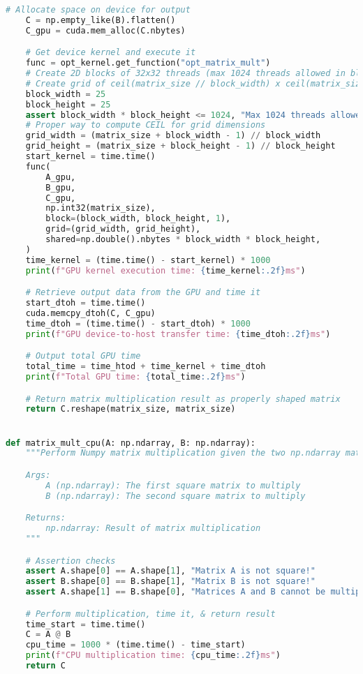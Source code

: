\documentclass[11pt,twoside]{article}
\begin{document}
\begin{enumerate}
\begin{lstlisting}[language=Python]
    # Allocate space on device for output
    C = np.empty_like(B).flatten()
    C_gpu = cuda.mem_alloc(C.nbytes)

    # Get device kernel and execute it
    func = opt_kernel.get_function("opt_matrix_mult")
    # Create 2D blocks of 32x32 threads (max 1024 threads allowed in block)
    # Create grid of ceil(matrix_size // block_width) x ceil(matrix_size // block_height) blocks
    block_width = 25
    block_height = 25
    assert block_width * block_height <= 1024, "Max 1024 threads allowed in block!"
    # Proper way to compute CEIL for grid dimensions
    grid_width = (matrix_size + block_width - 1) // block_width
    grid_height = (matrix_size + block_height - 1) // block_height
    start_kernel = time.time()
    func(
        A_gpu,
        B_gpu,
        C_gpu,
        np.int32(matrix_size),
        block=(block_width, block_height, 1),
        grid=(grid_width, grid_height),
        shared=np.double().nbytes * block_width * block_height,
    )
    time_kernel = (time.time() - start_kernel) * 1000
    print(f"GPU kernel execution time: {time_kernel:.2f}ms")

    # Retrieve output data from the GPU and time it
    start_dtoh = time.time()
    cuda.memcpy_dtoh(C, C_gpu)
    time_dtoh = (time.time() - start_dtoh) * 1000
    print(f"GPU device-to-host transfer time: {time_dtoh:.2f}ms")

    # Output total GPU time
    total_time = time_htod + time_kernel + time_dtoh
    print(f"Total GPU time: {total_time:.2f}ms")

    # Return matrix multiplication result as properly shaped matrix
    return C.reshape(matrix_size, matrix_size)


def matrix_mult_cpu(A: np.ndarray, B: np.ndarray):
    """Perform Numpy matrix multiplication given the two np.ndarray matrices

    Args:
        A (np.ndarray): The first square matrix to multiply
        B (np.ndarray): The second square matrix to multiply

    Returns:
        np.ndarray: Result of matrix multiplication
    """

    # Assertion checks
    assert A.shape[0] == A.shape[1], "Matrix A is not square!"
    assert B.shape[0] == B.shape[1], "Matrix B is not square!"
    assert A.shape[1] == B.shape[0], "Matrices A and B cannot be multiplied!"

    # Perform multiplication, time it, & return result
    time_start = time.time()
    C = A @ B
    cpu_time = 1000 * (time.time() - time_start)
    print(f"CPU multiplication time: {cpu_time:.2f}ms")
    return C



\end{lstlisting}
\end{enumerate}
\end{document}
